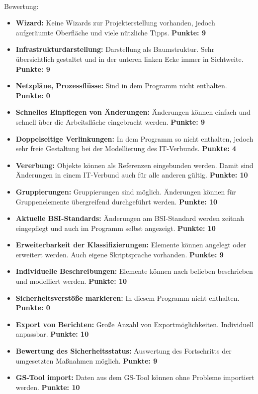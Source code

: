 \\
Bewertung:
\begin{itemize}
\item \textbf{Wizard:} Keine Wizards zur Projekterstellung vorhanden, jedoch aufgeräumte Oberfläche und viele nützliche Tipps. \textbf{Punkte: 9}
\item \textbf{Infrastrukturdarstellung:} Darstellung als Baumstruktur. Sehr übersichtlich gestaltet und in der unteren linken Ecke immer in Sichtweite. \textbf{Punkte: 9}
\item \textbf{Netzpläne, Prozessflüsse:} Sind in dem Programm nicht enthalten. \textbf{Punkte: 0}
\item \textbf{Schnelles Einpflegen von Änderungen: } Änderungen können einfach und schnell über die Arbeitsfläche eingebracht werden.  \textbf{Punkte: 9}
\item \textbf{Doppelseitige Verlinkungen:} In dem Programm so nicht enthalten, jedoch sehr freie Gestaltung bei der Modellierung des IT-Verbunds.  \textbf{Punkte: 4}
\item \textbf{Vererbung:} Objekte können als Referenzen eingebunden werden. Damit sind Änderungen in einem IT-Verbund auch für alle anderen gültig.  \textbf{Punkte: 10}
\item \textbf{Gruppierungen:} Gruppierungen sind möglich. Änderungen können für Gruppenelemente übergreifend durchgeführt werden.  \textbf{Punkte: 10}
\item \textbf{Aktuelle BSI-Standards:} Änderungen am BSI-Standard werden zeitnah eingepflegt und auch im Programm selbst angezeigt.  \textbf{Punkte: 10}
\item \textbf{Erweiterbarkeit der Klassifizierungen:} Elemente können angelegt oder erweitert werden. Auch eigene Skriptsprache vorhanden.  \textbf{Punkte: 9}
\item \textbf{Individuelle Beschreibungen:} Elemente können nach belieben beschrieben und modelliert werden.  \textbf{Punkte: 10}
\item \textbf{Sicherheitsverstöße markieren:} In diesem Programm nicht enthalten.  \textbf{Punkte: 0}
\item \textbf{Export von Berichten:} Große Anzahl von Exportmöglichkeiten. Individuell anpassbar.  \textbf{Punkte: 10}
\item \textbf{Bewertung des Sicherheitsstatus:} Auswertung des Fortschritts der umgesetzten Maßnahmen möglich.  \textbf{Punkte: 9}
\item \textbf{GS-Tool import:} Daten aus dem GS-Tool können ohne Probleme importiert werden.  \textbf{Punkte: 10}

\end{itemize}
